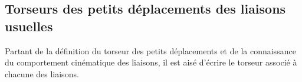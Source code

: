 \documentclass[10pt,oneside]{article}
\begin{document}
\subsection{Torseurs des petits déplacements des liaisons usuelles}
Partant de la définition du torseur des petits déplacements et de la connaissance du comportement cinématique des liaisons, il est aisé d'écrire le torseur associé à chacune des liaisons.

\begin{center}
\end{center}
\end{document}
